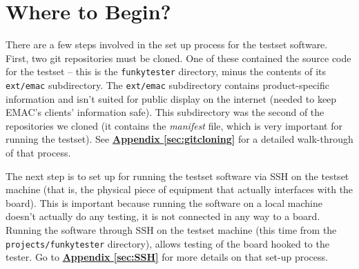 \documentclass{report}
\begin{document}
\section{Where to Begin?}
There are a few steps involved in the set up process for the testset software. First, two git repositories must be cloned. One of these contained the source code for the testset -- this is the \texttt{funkytester} directory, minus the contents of its \texttt{ext/emac} subdirectory. The \texttt{ext/emac} subdirectory contains product-specific information and isn't suited for public display on the internet (needed to keep EMAC's clients' information safe). This subdirectory was the second of the repositories we cloned (it contains the \textit{manifest} file, which is very important for running the testset). See \hyperref[sec:gitcloning]{\textbf{Appendix \ref{sec:gitcloning}}} for a detailed walk-through of that process.\\

The next step is to set up for running the testset software via SSH on the testset machine (that is, the physical piece of equipment that actually interfaces with the board). This is important because running the software on a local machine doesn't actually do any testing, it is not connected in any way to a board. Running the software through SSH on the testset machine (this time from the \texttt{projects/funkytester} directory), allows testing of the board hooked to the tester. Go to \hyperref[sec:SSH]{\textbf{Appendix \ref{sec:SSH}}} for more details on that set-up process.
\end{document}
